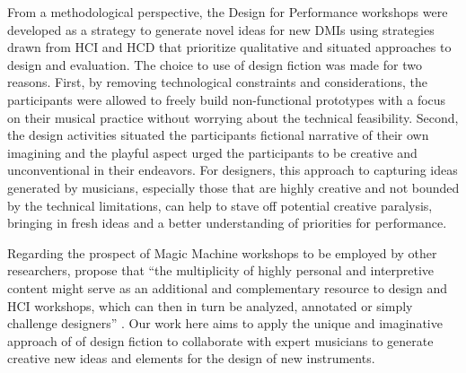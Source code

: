 \documentclass[letterpaper, 12pt]{article}
\begin{document}
From a methodological perspective, the Design for Performance workshops were developed as a strategy to generate novel ideas for new DMIs using strategies drawn from HCI and HCD that prioritize qualitative and situated approaches to design and evaluation. 
The choice to use of design fiction was made for two reasons. First, by removing technological constraints and considerations, the participants were allowed to freely build non-functional prototypes with a focus on their musical practice without worrying about the technical feasibility.
Second, the design activities situated the participants fictional narrative of their own imagining and the playful aspect urged the participants to be creative and unconventional in their endeavors. For designers, this approach to capturing ideas generated by musicians, especially those that are highly creative and not bounded by the technical limitations, can help to stave off potential creative paralysis, bringing in fresh ideas and a better understanding of priorities for performance.

Regarding the prospect of Magic Machine workshops to be employed by other researchers, \citeauthor{Andersen2019} propose that ``the multiplicity of highly personal and interpretive content might serve as an additional and complementary resource to design and HCI workshops, which can then in turn be analyzed, annotated or simply challenge designers'' \citeyearpar[p. 12]{Andersen2019}. Our work here aims to apply the unique and imaginative approach of of design fiction to collaborate with expert musicians to generate creative new ideas and elements for the design of new instruments. 

\end{document}
